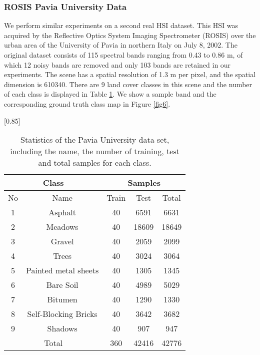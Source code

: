 \documentclass[journal]{IEEEtran}
\begin{document}
		\subsubsection{ROSIS Pavia University Data}
		We perform similar experiments on a second real HSI dataset. This HSI was acquired by the Reflective Optics System Imaging Spectrometer (ROSIS) over the urban area of the University of Pavia in northern Italy on July 8, 2002. The original dataset consists of 115 spectral bands ranging from 0.43 to 0.86 {{m}}, of which 12 noisy bands are removed and only 103 bands are retained in our experiments. The scene has a spatial resolution of 1.3 {{m}} per pixel, and the spatial dimension is 610340. There are 9 land cover classes in this scene and the number of each class is displayed in Table \ref{table3}. We show a sample band and the corresponding ground truth class map in Figure  \ref{fig6}.
		
		
	\begin{table}[htp]
		\caption{\label{table3} Statistics of the Pavia University data set, including the name, the number of training, test and total samples for each class.}
		\begin{center}
			{\normalsize
			\scalebox{0.85}[0.85]
				{
					\begin{tabular}{|c|c|c|c|c|}
						\hline
						\multicolumn{2}{|c}{Class} & \multicolumn{3}{|c|}{Samples}\\
						\hline
						No & Name & Train & Test & Total\\
						\hline
						1 & Asphalt &	40 & 6591  & 6631  \\
2 & Meadows	&  40 & 18609  & 18649\\
3 & Gravel	& 40 & 2059  & 2099\\
4 & Trees	& 40 & 3024  & 3064\\
5 & Painted metal sheets &	40 & 1305 & 1345\\
6 & Bare Soil &	40 & 4989 & 5029\\
7 & Bitumen	& 40 & 1290 & 1330\\
8 & Self-Blocking Bricks &	40 & 3642 & 3682 \\
9 & Shadows & 40 & 907 & 947\\
						\hline
						\multicolumn{2}{|c|}{Total} & 360 & 42416 & 42776\\
						\hline
					\end{tabular}
				}
			}
		\end{center}
	\end{table}		
		
\end{document}
